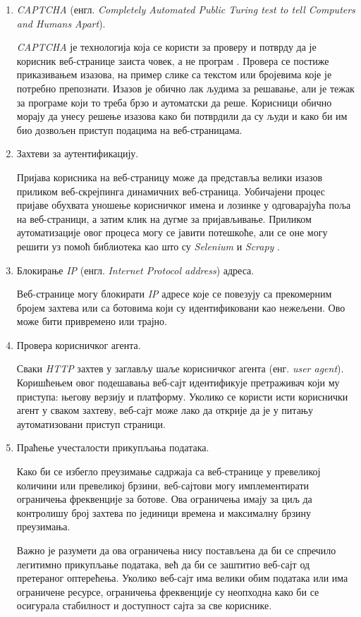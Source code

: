 \documentclass[12pt,oneside]{memoir}
\begin{document}
\begin{enumerate}
\item \textit{CAPTCHA} (енгл. \textit{Completely Automated Public Turing test to tell Computers and Humans Apart}).

    \textit{CAPTCHA} је технологија која се користи за проверу и потврду да је корисник веб-странице заиста човек, а не програм \cite{captcha}. Провера се постиже приказивањем изазова, на пример слике са текстом или бројевима које је потребно препознати. Изазов је обично лак људима за решавање, али је тежак за програме који то треба брзо и аутоматски да реше. Корисници обично морају да унесу решење изазова како би потврдили да су људи и како би им био дозвољен приступ подацима на веб-страницама.
\item Захтеви за аутентификацију.

    Пријава корисника на веб-страницу може да представља велики изазов приликом веб-скрејпинга динамичних веб-страница. Уобичајени процес пријаве обухвата уношење корисничког имена и лозинке у одговарајућа поља на веб-страници, а затим клик на дугме за пријављивање. Приликом аутоматизације овог процеса могу се јавити потешкоће, али се оне могу решити уз помоћ библиотека као што су \textit{Selenium} \cite{selenium} и \textit{Scrapy} \cite{scrapy}.

\item Блокирање \textit{IP} (енгл. \textit{Internet Protocol address}) адреса.

    Веб-странице могу блокирати \textit{IP} адресе које се повезују са прекомерним бројем захтева или са ботовима који су идентификовани као нежељени. Ово може бити привремено или трајно.
\item Провера корисничког агента.

    Сваки \textit{HTTP} захтев у заглављу шаље корисничког агента (енг. \textit{user agent}). Коришћењем овог подешавања веб-сајт идентификује претраживач који му приступа: његову верзију и платформу. Уколико се користи исти кориснички агент у сваком захтеву, веб-сајт може лако да открије да је у питању аутоматизовани приступ страници.
\item Праћење учесталости прикупљања података.

    Како би се избегло преузимање садржаја са веб-странице у превеликој количини или превеликој брзини, веб-сајтови могу имплементирати ограничења фреквенције за ботове. Ова ограничења имају за циљ да контролишу број захтева по јединици времена и максималну брзину преузимања.
    
    Важно је разумети да ова ограничења нису постављена да би се спречило легитимно прикупљање података, већ да би се заштитио веб-сајт од претераног оптерећења. Уколико веб-сајт има велики обим података или има ограничене ресурсе, ограничења фреквенције су неопходна како би се осигурала стабилност и доступност сајта за све кориснике.
\end{enumerate}
\end{document}
